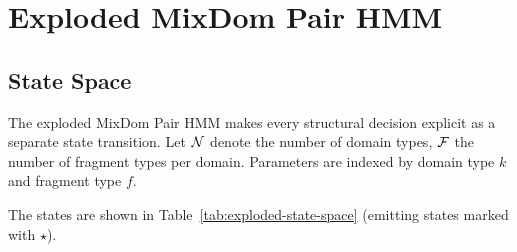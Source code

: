 %

\section{Exploded MixDom Pair HMM}
\label{sec:exploded-mixdom}

\subsection{State Space}

The exploded MixDom Pair HMM makes every structural decision explicit
as a separate state transition. Let $\mathcal{N}$ denote the number of domain
types, $\mathcal{F}$ the number of fragment types per domain. Parameters are
indexed by domain type $k$ and fragment type $f$.

The states are shown in Table~\ref{tab:exploded-state-space}
(emitting states marked with $\star$).

